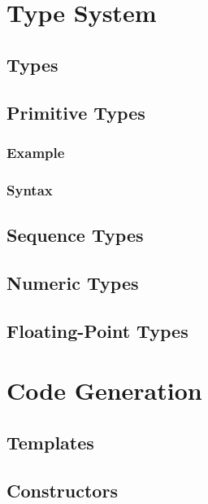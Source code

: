 \documentclass[a4paper,oneside,12pt, extrafontsizes]{memoir}
\begin{document}
\part{Type System}

\chapter{Types}

\chapter{Primitive Types}
\label{ch:primitive-types}


\section{Example}


\section{Syntax}


\chapter{Sequence Types}
\label{ch:sequence-types}

\chapter{Numeric Types}
\label{ch:numeric-types}

\chapter{Floating-Point Types}
\label{ch:floating-point}

\part{Code Generation}

\chapter{Templates}
\label{sec:templates}

\chapter{Constructors}
\label{sec:constructors}
\end{document}
